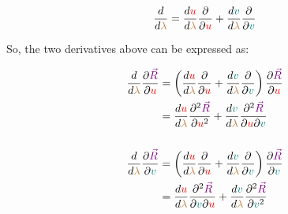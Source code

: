 \begin{equation}
    \frac{d}{d\begingroup\color{brown}\lambda\endgroup} = \frac{d\begingroup\color{red}u\endgroup}{d\begingroup\color{brown}\lambda\endgroup} \frac{\partial}{\partial \begingroup\color{red}u\endgroup} + 
    \frac{d\begingroup\color{teal}v\endgroup}{d\begingroup\color{brown}\lambda\endgroup} \frac{\partial}{\partial \begingroup\color{teal}v\endgroup}
\end{equation}

So, the two derivatives above can be expressed as:

\begin{align*}
    \frac{d}{d\begingroup\color{brown}\lambda\endgroup} \frac{\partial \begingroup\color{violet}\vec{R}\endgroup}{\partial \begingroup\color{red}u\endgroup} 
    &= \left(\frac{d\begingroup\color{red}u\endgroup}{d\begingroup\color{brown}\lambda\endgroup} \frac{\partial}{\partial \begingroup\color{red}u\endgroup} + 
    \frac{d\begingroup\color{teal}v\endgroup}{d\begingroup\color{brown}\lambda\endgroup} \frac{\partial}{\partial \begingroup\color{teal}v\endgroup}\right)
    \frac{\partial \begingroup\color{violet}\vec{R}\endgroup}{\partial \begingroup\color{red}u\endgroup}\\
    &= \frac{d\begingroup\color{red}u\endgroup}{d\begingroup\color{brown}\lambda\endgroup} \frac{\partial^2 \begingroup\color{violet}\vec{R}\endgroup}{\partial \begingroup\color{red}u\endgroup^2}
    + \frac{d\begingroup\color{teal}v\endgroup}{d\begingroup\color{brown}\lambda\endgroup} \frac{\partial^2 \begingroup\color{violet}\vec{R}\endgroup}{\partial \begingroup\color{red}u\endgroup \partial\begingroup\color{teal}v\endgroup}\\\\
    \frac{d}{d\begingroup\color{brown}\lambda\endgroup} \frac{\partial \begingroup\color{violet}\vec{R}\endgroup}{\partial \begingroup\color{teal}v\endgroup} 
    &= \left(\frac{d\begingroup\color{red}u\endgroup}{d\begingroup\color{brown}\lambda\endgroup} \frac{\partial}{\partial \begingroup\color{red}u\endgroup} + 
    \frac{d\begingroup\color{teal}v\endgroup}{d\begingroup\color{brown}\lambda\endgroup} \frac{\partial}{\partial \begingroup\color{teal}v\endgroup}\right)
    \frac{\partial \begingroup\color{violet}\vec{R}\endgroup}{\partial \begingroup\color{teal}v\endgroup}\\
    &= \frac{d\begingroup\color{red}u\endgroup}{d\begingroup\color{brown}\lambda\endgroup} \frac{\partial^2 \begingroup\color{violet}\vec{R}\endgroup}{\partial \begingroup\color{teal}v\endgroup \partial\begingroup\color{red}u\endgroup}
    + \frac{d\begingroup\color{teal}v\endgroup}{d\begingroup\color{brown}\lambda\endgroup} \frac{\partial^2 \begingroup\color{violet}\vec{R}\endgroup}{\partial\begingroup\color{teal}v\endgroup^2}
\end{align*}

